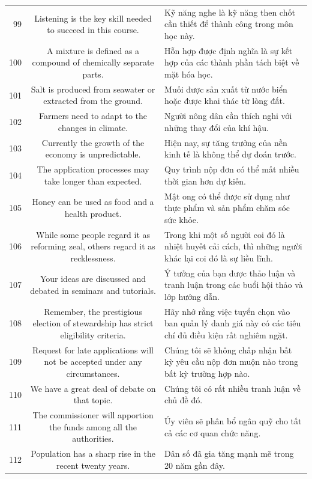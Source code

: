 \documentclass[11pt,a4paper]{article}
\begin{document}
\begin{longtable}{N S M}
99 & Listening is the key skill needed to succeed in this course. & Kỹ năng nghe là kỹ năng then chốt cần thiết để thành công trong môn học này. \\
100 & A mixture is defined as a compound of chemically separate parts. & Hỗn hợp được định nghĩa là sự kết hợp của các thành phần tách biệt về mặt hóa học. \\
101 & Salt is produced from seawater or extracted from the ground. & Muối được sản xuất từ nước biển hoặc được khai thác từ lòng đất. \\
102 & Farmers need to adapt to the changes in climate. & Người nông dân cần thích nghi với những thay đổi của khí hậu. \\
103 & Currently the growth of the economy is unpredictable. & Hiện nay, sự tăng trưởng của nền kinh tế là không thể dự đoán trước. \\
104 & The application processes may take longer than expected. & Quy trình nộp đơn có thể mất nhiều thời gian hơn dự kiến. \\
105 & Honey can be used as food and a health product. & Mật ong có thể được sử dụng như thực phẩm và sản phẩm chăm sóc sức khỏe. \\
106 & While some people regard it as reforming zeal, others regard it as recklessness. & Trong khi một số người coi đó là nhiệt huyết cải cách, thì những người khác lại coi đó là sự liều lĩnh. \\
107 & Your ideas are discussed and debated in seminars and tutorials. & Ý tưởng của bạn được thảo luận và tranh luận trong các buổi hội thảo và lớp hướng dẫn. \\
108 & Remember, the prestigious election of stewardship has strict eligibility criteria. & Hãy nhớ rằng việc tuyển chọn vào ban quản lý danh giá này có các tiêu chí đủ điều kiện rất nghiêm ngặt. \\
109 & Request for late applications will not be accepted under any circumstances. & Chúng tôi sẽ không chấp nhận bất kỳ yêu cầu nộp đơn muộn nào trong bất kỳ trường hợp nào. \\
110 & We have a great deal of debate on that topic. & Chúng tôi có rất nhiều tranh luận về chủ đề đó. \\
111 & The commissioner will apportion the funds among all the authorities. & Ủy viên sẽ phân bổ ngân quỹ cho tất cả các cơ quan chức năng. \\
112 & Population has a sharp rise in the recent twenty years. & Dân số đã gia tăng mạnh mẽ trong 20 năm gần đây. \\

\end{longtable}
\end{document}
